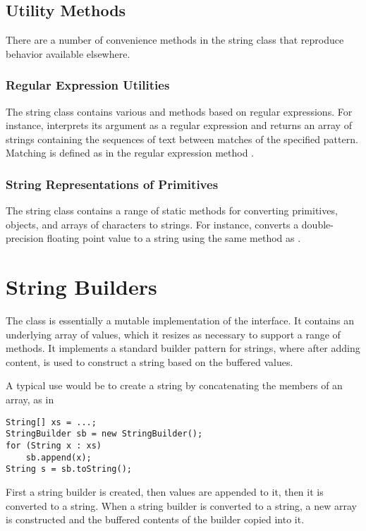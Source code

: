 \subsection{Utility Methods}

There are a number of convenience methods in the string class that
reproduce behavior available elsewhere.  

\subsubsection{Regular Expression Utilities}

The string class contains various  and
\code{()} methods based on regular expressions.
For instance,  interprets its argument as a
regular expression and returns an array of strings containing the
sequences of text between matches of the specified pattern.
Matching is defined as in the regular expression method
.

\subsubsection{String Representations of Primitives}

The string class contains a range of static 
methods for converting primitives, objects, and arrays of characters
to strings.  For instance,  converts a
double-precision floating point value to a string using the same
method as .



\section{String Builders}

The  class is essentially a mutable implementation
of the  interface.  It contains an underlying array
of  values, which it resizes as necessary to support a
range of  methods.  It implements a standard
builder pattern for strings, where after adding content, 
is used to construct a string based on the buffered values.

A typical use would be to create a string by concatenating the members
of an array, as in
%
\begin{verbatim}
String[] xs = ...;
StringBuilder sb = new StringBuilder();
for (String x : xs)
    sb.append(x);
String s = sb.toString();
\end{verbatim}
%
First a string builder is created, then values are appended to it,
then it is converted to a string.  When a string builder is converted
to a string, a new array is constructed and the buffered contents of
the builder copied into it.

